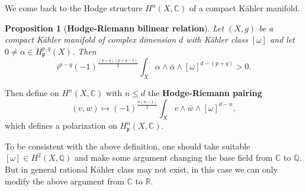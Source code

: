 \documentclass{article}
\theoremstyle{definition}
\theoremstyle{plain}
\newtheorem{proposition}[definition]{Proposition}
\begin{document}
We come back to the Hodge structure $ H^n(X,\mathbb{C}) $ of a compact K\"{a}hler manifold. 

\begin{proposition}[\textbf{Hodge-Riemann bilinear relation}]
    Let $ (X,g) $ be a compact K\"{a}hler manifold of complex dimension $ d $ with K\"{a}hler class $ [\omega] $ and let $ 0\neq \alpha \in H^{p,q}_{\mathfrak{p}}(X) $. Then\[
        i^{p-q}(-1)^{\frac{(p+q)(p+q-1)}{2}}\int\nolimits_X \alpha\wedge\bar{\alpha}\wedge[\omega]^{d-(p+q)}>0.
    \]
\end{proposition}

Then define on $ H^n(X,\mathbb{C}) $ with $ n\leqslant d $ the \textbf{Hodge-Riemann pairing}\[
    (v,w)\longmapsto (-1)^{\frac{n(n-1)}{2}}\int\nolimits_{X}v\wedge \bar{w}\wedge [\omega]^{d-n},
\]which defines a polarization on $ H^n_{\mathfrak{p}}(X,\mathbb{C}) $.

To be consistent with the above definition, one should take suitable $ [\omega]\in H^2(X,\mathbb{Q}) $ and make some argument changing the base field from $ \mathbb{C} $ to $ \mathbb{Q} $. But in general rational K\"{a}hler class may not exist, in this case we can only modify the above argument from $ \mathbb{C} $ to $ \mathbb{R} $.




\end{document}
